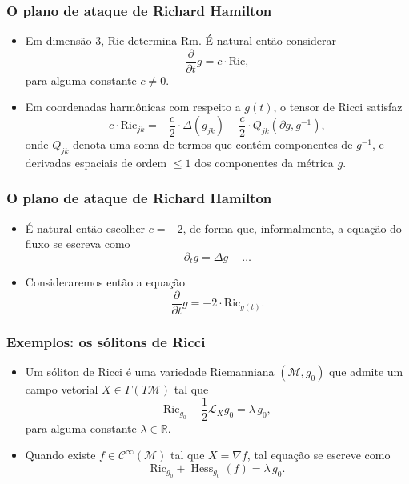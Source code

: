 \documentclass{beamer}
\newcommand{\Ric}{\mathrm{Ric}}
\newcommand{\mm}{\mathcal{M}}
\newcommand{\parent}[1]{\left( #1 \right)}
\begin{document}
\begin{frame}
\frametitle{O plano de ataque de Richard Hamilton}
\begin{itemize}
\item Em dimensão $3$, $\mathrm{Ric}$ determina $\mathrm{Rm}$. É natural então considerar
\[
\frac{\partial}{\partial t} g = c \cdot \mathrm{Ric},
\]
para alguma constante $c \neq 0$.
\item Em coordenadas harmônicas com respeito a $g(t)$, o tensor de Ricci satisfaz
\begin{equation*}\label{calRicci}
c \cdot \Ric_{jk} = -\frac{c}{2} \cdot \Delta(g_{jk}) - \frac{c}{2} \cdot Q_{jk}(\partial g, g^{-1}),
\end{equation*}
onde $Q_{jk}$ denota uma soma de termos que contém componentes de $g^{-1}$, e derivadas espaciais de ordem $\leq 1$ dos componentes da métrica $g$.
\end{itemize} 
\end{frame}

\begin{frame}
\frametitle{O plano de ataque de Richard Hamilton}
\begin{itemize}
\item É natural então escolher $c = -2$, de forma que, informalmente, a equação do fluxo se escreva como
\[
\partial_t g = \Delta g + \ldots
\] 
\item Consideraremos então a equação
\[
\frac{\partial}{\partial t} g = -2 \cdot \mathrm{Ric}_{g(t)}.
\]

\end{itemize} 


\end{frame}

\begin{frame}
\frametitle{Exemplos: os sólitons de Ricci}
\begin{itemize}
\item Um sóliton de Ricci é uma variedade Riemanniana $\parent{\mm, g_0}$ que admite um campo vetorial $X \in \Gamma\parent{T \mm}$ tal que $$\Ric_{g_0} + \frac{1}{2} \mathscr{L}_{X} g_0 = \lambda \, g_0,$$
para alguma constante $\lambda \in \mathbb{R}$.
\item Quando existe $f \in \mathscr{C}^{\infty}(\mm)$ tal que $X = \nabla f$, tal equação se escreve como
\[
\Ric_{g_0} + \operatorname{Hess}_{g_0}(f) = \lambda \,  g_0.
\]
\end{itemize}
\end{frame}
\end{document}

